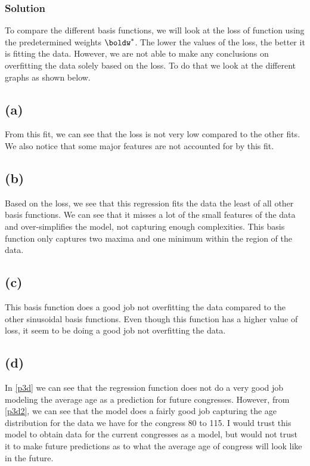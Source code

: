 \documentclass[submit]{harvardml}
\begin{document}
\subsubsection*{Solution}
To compare the different basis functions, we will look at the loss of function using the predetermined weights $\boldw^*$. The lower the values of the loss, the better it is fitting the data. However, we are not able to make any conclusions on overfitting the data solely based on the loss. To do that we look at the different graphs as shown below.
\subsection*{(a)}
From this fit, we can see that the loss is not very low compared to the other fits. We also notice that some major features are not accounted for by this fit.
\subsection*{(b)}
Based on the loss, we see that this regression fits the data the least of all other basis functions. We can see that it misses a lot of the small features of the data and over-simplifies the model, not capturing enough complexities. This basis function only captures two maxima and one minimum within the region of the data.

\subsection*{(c)}
This basis function does a good job not overfitting the data compared to the other sinusoidal basis functions. Even though this function has a higher value of loss, it seem to be doing a good job not overfitting the data. 
\subsection*{(d)}
In \cref{p3d} we can see that the regression function does not do a very good job modeling the average age as a prediction for future congresses. However, from \cref{p3d2}, we can see that the model does a fairly good job capturing the age distribution for the data we have for the congress 80 to 115. I would trust this model to obtain data for the current congresses as a model, but would not trust it to make future predictions as to what the average age of congress will look like in the future.
\end{document}
